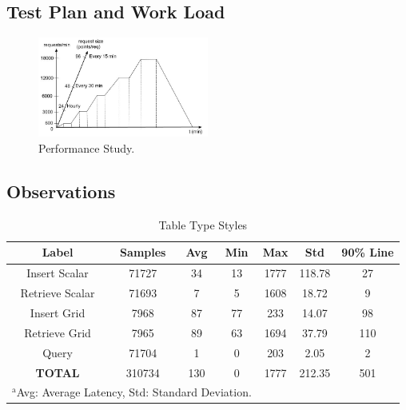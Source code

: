 \documentclass[conference]{IEEEtran}
\begin{document}
\subsection{Test Plan and Work Load}
\begin{figure}[htbp]
\centerline{\includegraphics[width=0.5\textwidth]{results/work_load/performance_study_v4.jpg}}
\caption{Performance Study.}
\label{fi:performance_Study}
\end{figure}

\subsection{Observations}
\begin{table}[htbp]
\caption{Table Type Styles}
\begin{center}
\begin{tabular}{|c|c|c|c|c|c|c|}
\hline
\textbf{Label} & \textbf{Samples} & \textbf{Avg} & \textbf{Min} & \textbf{Max} & \textbf{Std} & \textbf{90\% Line} \\ \hline
Insert Scalar & 71727 & 34 & 13 & 1777 & 118.78 & 27 \\ \hline
Retrieve Scalar & 71693 & 7 & 5 & 1608 & 18.72 & 9 \\ \hline
Insert Grid & 7968 & 87 & 77 & 233 & 14.07 & 98 \\ \hline
Retrieve Grid & 7965 & 89 & 63 & 1694 & 37.79 & 110 \\ \hline
Query & 71704 & 1 & 0 & 203 & 2.05 & 2 \\ \hline
\textbf{TOTAL} & 310734 & 130 & 0 & 1777 & 212.35 & 501 \\ \hline
\multicolumn{4}{l}{$^{\mathrm{a}}$Avg: Average Latency, Std: Standard Deviation.}
\end{tabular}
\label{tab:obs_all_auto_15_min_summary_latency}
\end{center}
\end{table}
\end{document}
